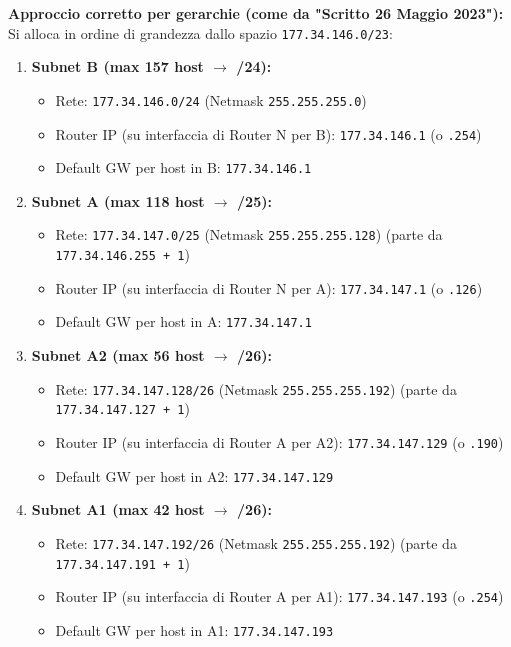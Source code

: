 \textbf{Approccio corretto per gerarchie (come da "Scritto 26 Maggio 2023"):}
Si alloca in ordine di grandezza dallo spazio \texttt{177.34.146.0/23}:
\begin{enumerate}[label=\arabic*.]
    \item \textbf{Subnet B (max 157 host $\to$ /24):}
    \begin{itemize}
        \item Rete: \texttt{177.34.146.0/24} (Netmask \texttt{255.255.255.0})
        \item Router IP (su interfaccia di Router N per B): \texttt{177.34.146.1} (o \texttt{.254})
        \item Default GW per host in B: \texttt{177.34.146.1}
    \end{itemize}
    \item \textbf{Subnet A (max 118 host $\to$ /25):}
    \begin{itemize}
        \item Rete: \texttt{177.34.147.0/25} (Netmask \texttt{255.255.255.128}) (parte da \texttt{177.34.146.255 + 1})
        \item Router IP (su interfaccia di Router N per A): \texttt{177.34.147.1} (o \texttt{.126})
        \item Default GW per host in A: \texttt{177.34.147.1}
    \end{itemize}
    \item \textbf{Subnet A2 (max 56 host $\to$ /26):}
    \begin{itemize}
        \item Rete: \texttt{177.34.147.128/26} (Netmask \texttt{255.255.255.192}) (parte da \texttt{177.34.147.127 + 1})
        \item Router IP (su interfaccia di Router A per A2): \texttt{177.34.147.129} (o \texttt{.190})
        \item Default GW per host in A2: \texttt{177.34.147.129}
    \end{itemize}
    \item \textbf{Subnet A1 (max 42 host $\to$ /26):}
    \begin{itemize}
        \item Rete: \texttt{177.34.147.192/26} (Netmask \texttt{255.255.255.192}) (parte da \texttt{177.34.147.191 + 1})
        \item Router IP (su interfaccia di Router A per A1): \texttt{177.34.147.193} (o \texttt{.254})
        \item Default GW per host in A1: \texttt{177.34.147.193}
    \end{itemize}
\end{enumerate}

